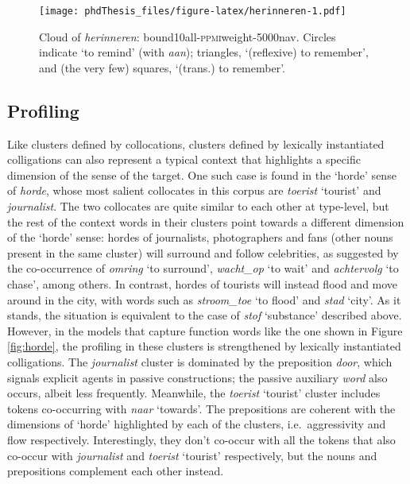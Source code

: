 \documentclass[
]{book}
\begin{document}
\begin{figure}
\centering
\texttt{[image: phdThesis\_files/figure-latex/herinneren-1.pdf]}
\caption{\label{fig:herinneren}Cloud of \emph{herinneren}: bound10all-\textsc{ppmi}weight-\textsc{5000}nav. Circles indicate `to remind' (with \emph{aan}); triangles, `(reflexive) to remember', and (the very few) squares, `(trans.) to remember'.}
\end{figure}

\hypertarget{profiling}{%
\subsection{Profiling}\label{profiling}}

Like clusters defined by collocations, clusters defined by lexically instantiated colligations can also represent a typical context that highlights a specific dimension of the sense of the target. One such case is found in the `horde' sense of \emph{horde}, whose most salient collocates in this corpus are \emph{toerist} `tourist' and \emph{journalist}. The two collocates are quite similar to each other at type-level, but the rest of the context words in their clusters point towards a different dimension of the `horde' sense: hordes of journalists, photographers and fans (other nouns present in the same cluster) will surround and follow celebrities, as suggested by the co-occurrence of \emph{omring} `to surround', \emph{wacht\_op} `to wait' and \emph{achtervolg} `to chase', among others. In contrast, hordes of tourists will instead flood and move around in the city, with words such as \emph{stroom\_toe} `to flood' and \emph{stad} `city'.
As it stands, the situation is equivalent to the case of \emph{stof} `substance' described above. However, in the models that capture function words
like the one shown in Figure \ref{fig:horde},
the profiling in these clusters is strengthened by lexically instantiated colligations. The \emph{journalist} cluster is dominated by the preposition \emph{door}, which signals explicit agents in passive constructions;
the passive auxiliary \emph{word} also occurs, albeit less frequently. Meanwhile, the \emph{toerist} `tourist' cluster includes tokens co-occurring with \emph{naar} `towards'. The prepositions are coherent with the dimensions of `horde' highlighted by each of the clusters, i.e.~aggressivity and flow respectively. Interestingly, they don't co-occur with all the tokens that also co-occur with \emph{journalist} and \emph{toerist} `tourist' respectively, but the nouns and prepositions complement each other instead.
\end{document}
